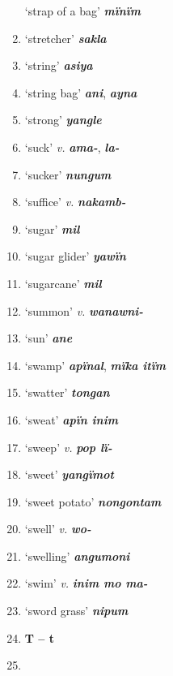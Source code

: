 \begin{enumerate}[noitemsep, label={}, align=left, widest=190, labelsep=1ex,leftmargin=*,itemindent=-10pt]
‘strap of a bag’ \textbf{\textit{mïnïm}} \item
‘stretcher’ \textbf{\textit{sakla}} \item
‘string’ \textbf{\textit{asiya}} \item
‘string bag’ \textbf{\textit{ani}}, \textbf{\textit{ayna}} \item
‘strong’ \textbf{\textit{yangle}} \item
‘suck’ \textit{v.} \textbf{\textit{ama-}}, \textbf{\textit{la-}} \item
‘sucker’ \textbf{\textit{nungum}} \item
‘suffice’ \textit{v.} \textbf{\textit{nakamb-}} \item
‘sugar’ \textbf{\textit{mil}} \item
‘sugar glider’ \textbf{\textit{yawïn}} \item
‘sugarcane’ \textbf{\textit{mil}} \item
‘summon’ \textit{v.} \textbf{\textit{wanawni-}} \item
‘sun’ \textbf{\textit{ane}} \item
‘swamp’ \textbf{\textit{apïnal}}, \textbf{\textit{mïka itïm}} \item
‘swatter’ \textbf{\textit{tongan}} \item
‘sweat’ \textbf{\textit{apïn inim}} \item
‘sweep’ \textit{v.} \textbf{\textit{pop lï-}} \item
‘sweet’ \textbf{\textit{yangïmot}} \item
‘sweet potato’ \textbf{\textit{nongontam}} \item
‘swell’ \textit{v.} \textbf{\textit{wo-}} \item
‘swelling’ \textbf{\textit{angumoni}} \item
‘swim’ \textit{v.} \textbf{\textit{inim mo ma-}} \item
‘sword grass’ \textbf{\textit{nipum}}\\ \item

\noindent \textbf{T – t}\\ \item


\end{enumerate}
